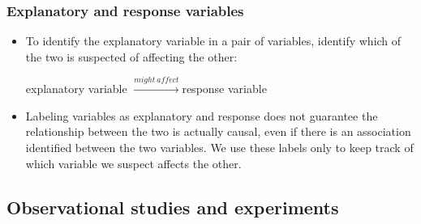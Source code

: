 \begin{frame}
\frametitle{Explanatory and response variables}

\begin{itemize}

\item To identify the explanatory variable in a pair of variables, identify which of the two is suspected of affecting the other:

\begin{center}
explanatory variable $\xrightarrow{might~affect}$response variable
\end{center}

\item Labeling variables as explanatory and response does not guarantee the relationship between the two is actually causal, even if there is an association identified between the two variables. We use these labels only to keep track of which variable we suspect affects the other.

\end{itemize}

\end{frame}


\subsection{Observational studies and experiments}


